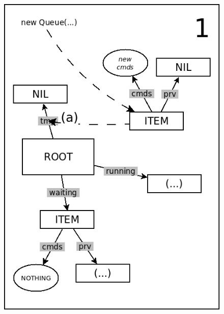 \documentclass{acm_proc_article-sp}
\begin{document}
\begin{figure}
\begin{minipage}[t]{0.24\linewidth}
\includegraphics[scale=0.25]{queue-21.png}
\end{minipage}
\begin{minipage}[t]{0.24\linewidth}
\centering

\end{minipage}
\end{figure}
\end{document}
